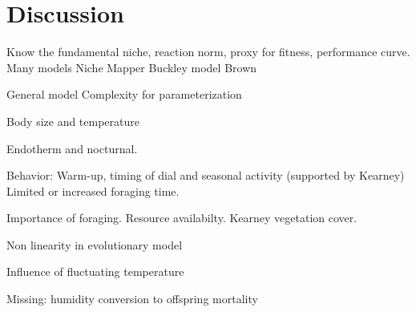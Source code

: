 \section*{Discussion}
Know the fundamental niche, reaction norm, proxy for fitness, performance curve.
Many models
Niche Mapper
Buckley model
Brown

General model
Complexity for parameterization

Body size and temperature

Endotherm and nocturnal.


Behavior: Warm-up, timing of dial and seasonal activity (supported by Kearney)
Limited or increased foraging time. 

Importance of foraging.
Resource availabilty. 
Kearney vegetation cover.

Non linearity in evolutionary model

Influence of fluctuating temperature

Missing:
humidity
conversion to offspring
mortality



